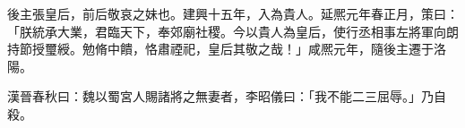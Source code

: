 
\begin{pinyinscope}
後主張皇后，前后敬哀之妹也。建興十五年，入為貴人。延熈元年春正月，策曰：「朕統承大業，君臨天下，奉郊廟社稷。今以貴人為皇后，使行丞相事左將軍向朗持節授璽綬。勉脩中饋，恪肅禋祀，皇后其敬之哉！」咸熈元年，隨後主遷于洛陽。

漢晉春秋曰：魏以蜀宮人賜諸將之無妻者，李昭儀曰：「我不能二三屈辱。」乃自殺。


\end{pinyinscope}